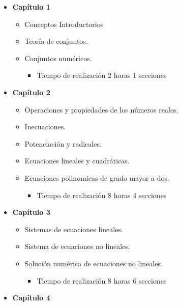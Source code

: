\documentclass[
]{book}
\providecommand{\tightlist}{%
  \setlength{\itemsep}{0pt}\setlength{\parskip}{0pt}}
\begin{document}
\begin{itemize}
\tightlist
\item
  \textbf{Capítulo 1}

  \begin{itemize}
  \tightlist
  \item
    Conceptos Introductorios
  \item
    Teoría de conjuntos.
  \item
    Conjuntos numéricos.

    \begin{itemize}
    \tightlist
    \item
      Tiempo de realización 2 horas 1 secciones
    \end{itemize}
  \end{itemize}
\item
  \textbf{Capítulo 2}

  \begin{itemize}
  \tightlist
  \item
    Operaciones y propiedades de los números reales.
  \item
    Inecuaciones.
  \item
    Potenciación y radicales.
  \item
    Ecuaciones lineales y cuadráticas.
  \item
    Ecuaciones polinomicas de grado mayor a dos.

    \begin{itemize}
    \tightlist
    \item
      Tiempo de realización 8 horas 4 secciones
    \end{itemize}
  \end{itemize}
\item
  \textbf{Capítulo 3}

  \begin{itemize}
  \tightlist
  \item
    Sistemas de ecuaciones lineales.
  \item
    Sistema de ecuaciones no lineales.
  \item
    Solución numérica de ecuaciones no lineales.

    \begin{itemize}
    \tightlist
    \item
      Tiempo de realización 8 horas 6 secciones
    \end{itemize}
  \end{itemize}
\item
  \textbf{Capítulo 4}


\end{itemize}
\end{document}
